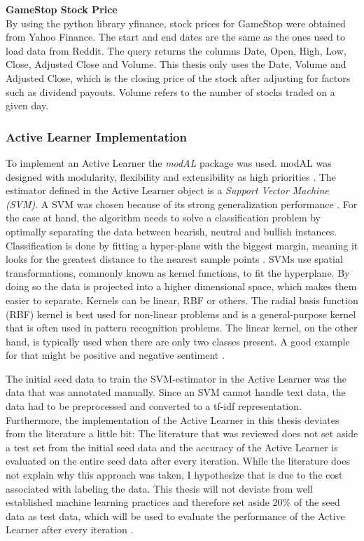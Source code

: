 \documentclass[11pt, a4paper]{article}
\begin{document}
\noindent\textbf{GameStop Stock Price}\\
By using the python library yfinance, stock prices for GameStop were obtained from Yahoo Finance. The start and end dates are the same as the ones used to load data from Reddit.
The query returns the columns Date, Open, High, Low, Close, Adjusted Close and Volume. This thesis only uses the Date, Volume and Adjusted Close, which is the closing price
of the stock after adjusting for factors such as dividend payouts. Volume refers to the number of stocks traded on a given day.

\subsubsection{Active Learner Implementation}
To implement an Active Learner the \emph{modAL} package was used. modAL was designed with modularity, flexibility and extensibility as high priorities \citep{danka2018modal}. 
The estimator defined in the Active Learner object is a \emph{Support Vector Machine (SVM)}. A SVM was chosen because of its strong generalization 
performance \citep{alves2014comparisonsvm}.
For the case at hand, the algorithm needs to solve a classification problem by optimally separating the data between bearish, 
neutral and bullish instances. Classification is done by fitting a hyper-plane with the biggest margin, meaning it looks for the greatest distance 
to the nearest sample points \citep{jemai2021SentimentAnalysis}. SVMs use spatial transformations, commonly known as kernel functions, to fit the hyperplane.
By doing so the data is projected into a higher dimensional space, which makes them easier to separate.
Kernels can be linear, RBF or others. The radial basis function (RBF) kernel is best used for non-linear problems and is a general-purpose kernel that 
is often used in pattern recognition problems. The linear kernel, on the other hand, is typically used when there are only two classes present. 
A good example for that might be positive and negative sentiment \citep{alves2014comparisonsvm}.

The initial seed data to train the SVM-estimator in the Active Learner was the data that was annotated manually.
Since an SVM cannot handle text data, the data had to be preprocessed and converted to a tf-idf representation. %
Furthermore, the implementation of the Active Learner in this thesis deviates from the literature a little bit: The literature that was reviewed
does not set aside a test set from the initial seed data and the accuracy of the Active Learner is evaluated on the entire seed data after every iteration. 
While the literature does not explain why this approach was
taken, I hypothesize that is due to the cost associated with labeling the data. This thesis will not deviate from well established machine learning practices
and therefore set aside 20\% of the seed data as test data, which will be used to evaluate the performance of the Active Learner after every iteration \cite[p. 196]{raschka2019pythonmachinelearning}.
\end{document}

